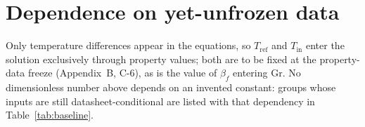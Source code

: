 \section{Dependence on yet-unfrozen data}
Only temperature differences appear in the equations, so $T_{\mathrm{ref}}$ and $T_{\mathrm{in}}$
enter the solution exclusively through property values; both are to be fixed at the property-data
freeze (Appendix~B, C-6), as is the value of $\beta_f$ entering $\mathrm{Gr}$. No dimensionless
number above depends on an invented constant: groups whose inputs are still datasheet-conditional
are listed with that dependency in Table~\ref{tab:baseline}.

